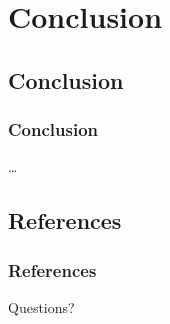 \documentclass{beamer}
\begin{document}
\section{Conclusion}

	\subsection{Conclusion}
	\begin{frame}
		\frametitle{Conclusion}
		\ldots
	\end{frame}

	\subsection{References}
	\begin{frame}[allowframebreaks]
		\frametitle{References}
		
		
	\end{frame}

	\begin{frame}
	\Huge{\centerline{Questions?}}
	\end{frame}
\end{document}
